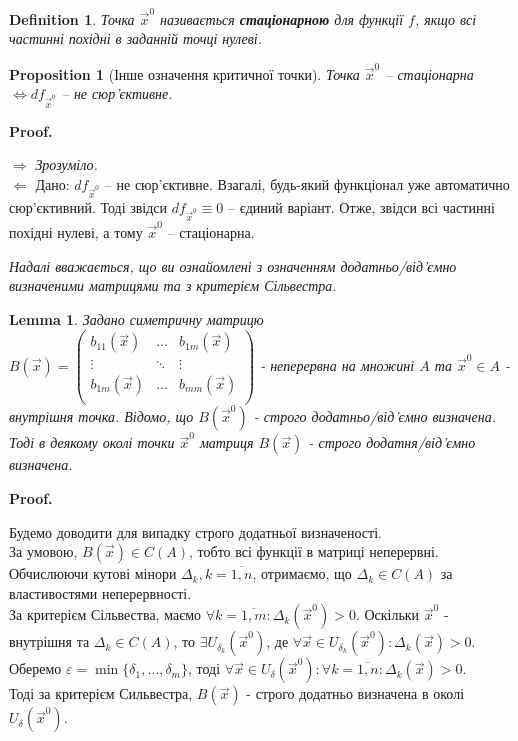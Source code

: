 \documentclass[a4paper, 10pt]{article}
\makeatletter
\def\qed{$\blacksquare$}
\def\rightproof{$\boxed{\Rightarrow}$ }
\def\leftproof{$\boxed{\Leftarrow}$ }
\theoremstyle{theoremdd}
\theoremstyle{theoremdd}
\theoremstyle{theoremdd}
\newtheorem{definition}[theorem]{Definition}
\theoremstyle{theoremdd}
\theoremstyle{theoremdd}
\theoremstyle{theoremdd}
\newtheorem{proposition}[theorem]{Proposition}
\theoremstyle{theoremdd}
\theoremstyle{theoremdd}
\newtheorem{lemma}[theorem]{Lemma}
\theoremstyle{theoremdd}
\renewenvironment{proof}[1][Proof.\\]{\par
\pushQED{\hfill \qed}%
\normalfont \topsep6\p@\@plus6\p@\relax
\trivlist
\item\relax
{\bfseries
#1\@addpunct{.}}\hspace\labelsep\ignorespaces
}{%
\popQED\endtrivlist\@endpefalse
}
\makeatother
\begin{document}
\begin{definition}
Точка $\vec{x}^0$ називається \textbf{стаціонарною} для функції $f$, якщо всі частинні похідні в заданній точці нулеві.
\end{definition}

\begin{proposition}[Інше означення критичної точки]
Точка $\vec{x}^0$ -- стаціонарна $\iff df_{\vec{x}^0}$ -- не сюр'єктивне.
\end{proposition}

\begin{proof}
\rightproof \textit{Зрозуміло.}
\bigskip \\
\leftproof Дано: $ df_{\vec{x}^0}$ -- не сюр'єктивне. Взагалі, будь-який функціонал уже автоматично сюр'єктивний. Тоді звідси $ df_{\vec{x}^0} \equiv 0$ -- єдиний варіант. Отже, звідси всі частинні похідні нулеві, а тому $\vec{x}^0$ -- стаціонарна.
\end{proof}

\iffalse
\textit{Надалі вважається, що ви ознайомлені з означенням додатньо/від'ємно визначеними матрицями та з критерієм Сільвестра.}

\begin{lemma}
Задано симетричну матрицю $B(\vec{x}) = \begin{pmatrix}
b_{11}(\vec{x}) & \dots & b_{1m}(\vec{x}) \\
\vdots & \ddots & \vdots \\
b_{1m}(\vec{x}) & \dots & b_{mm}(\vec{x}) \\
\end{pmatrix}$ - неперервна на множині $A$ та $\vec{x}^0 \in A$ - внутрішня точка. Відомо, що $B(\vec{x}^0)$ - строго додатньо/від'ємно визначена. \\ Тоді в деякому околі точки $\vec{x}^0$ матриця $B(\vec{x})$ - строго додатня/від'ємно визначена.
\end{lemma}

\begin{proof}
Будемо доводити для випадку строго додатньої визначеності.\\
За умовою, $B(\vec{x}) \in C(A)$, тобто всі функції в матриці неперервні. Обчислюючи кутові мінори $\Delta_k, k = \overline{1,n}$, отримаємо, що $\Delta_k \in C(A)$ за властивостями неперервності.\\
За критерієм Сільвества, маємо $\forall k = \overline{1,m}: \Delta_k (\vec{x}^0) > 0$. Оскільки $\vec{x}^0$ - внутрішня та $\Delta_k \in C(A)$, то $\exists U_{\delta_k}(\vec{x}^0)$, де $\forall \vec{x} \in U_{\delta_k}(\vec{x}^0): \Delta_k(\vec{x}) > 0$.\\
Оберемо $\varepsilon = \min \{\delta_1, \dots, \delta_m \}$, тоді $\forall \vec{x} \in U_{\delta}(\vec{x}^0): \forall k = \overline{1,n}: \Delta_k(\vec{x}) > 0$.\\
Тоді за критерієм Сильвестра, $B(\vec{x})$ - строго додатньо визначена в околі $U_\delta (\vec{x}^0)$.
\end{proof}
\end{document}
